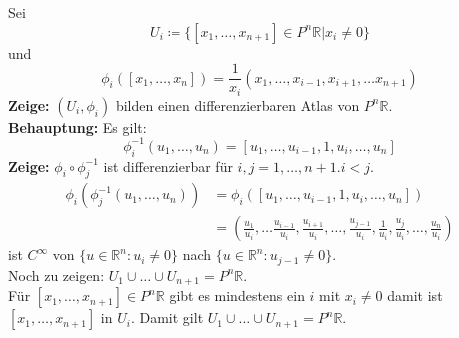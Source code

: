 \begin{problem*}[3a]
  Sei 
  \begin{equation*} 
    U_i \coloneqq \{ [x_1, \dots , x_{n+1}] \in P^n\mathbb{R} | x_i \neq 0 \}
  \end{equation*}
  und 
  \begin{equation*}
    \phi_i ([x_1, \dots , x_{n}]) = \frac{1}{x_i}(x_1, \dots , x_{i-1},x_{i+1}, \dots x_{n+1})
  \end{equation*}
  \textbf{Zeige:} \( (U_i, \phi_i) \) bilden einen differenzierbaren Atlas von \( P^n\mathbb{R} \). \\
  \textbf{Behauptung:} Es gilt:
  \begin{equation*}
    \phi_i^{-1} (u_1, \dots , u_{n}) = [u_1, \dots , u_{i-1}, 1, u_i, \dots , u_n]
  \end{equation*}
  \textbf{Zeige:} \( \phi_i \circ \phi^{-1}_j \) ist differenzierbar für \( i,j = 1, \dots, n+1. i < j \).
  \begin{align*}
    \phi_i (\phi_j^{-1} (u_1, \dots , u_{n})) &= \phi_i([u_1, \dots , u_{i-1}, 1, u_i, \dots , u_n]) \\
    &= \left( 
    \frac{u_1}{u_i}, \dots \frac{u_{i-1}}{u_i}, \frac{u_{i+1}}{u_i}, \dots , \frac{u_{j-1}}{u_i}, \frac{1}{u_i}, \frac{u_{j}}{u_i}, \dots, \frac{u_n}{u_i} 
    \right)
  \end{align*}
  ist \( C^{\infty} \) von \( \{ u \in \mathbb{R}^n : u_i \neq 0 \} \) nach \( \{ u \in \mathbb{R}^n : u_{j-1} \neq 0 \} \). \\
  Noch zu zeigen: \( U_1 \cup \dots \cup U_{n+1} = P^n\mathbb{R} \). \\
  Für \( [x_1, \dots , x_{n+1}] \in P^n\mathbb{R} \) gibt es mindestens ein \( i \) mit \( x_i \neq 0 \) damit ist \( [x_1, \dots , x_{n+1}] \) in \( U_i \). Damit gilt \( U_1 \cup \dots \cup U_{n+1} = P^n\mathbb{R} \). 
\end{problem*}

